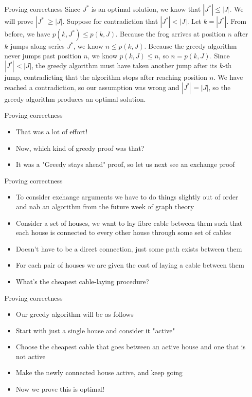 \documentclass{beamer}
\begin{document}
\begin{frame}[plain]{Proving correctness}
Since $J^*$ is an optimal solution, we know that
$| J^*| \leq | J|$. We will prove $| J^*| \geq | J|$.
Suppose for contradiction that $| J^*| < | J|$. Let
$k = | J^*|$. From before, we have $p(k, J^*) \leq p(k, J)$.
Because the frog arrives at position $n$ after $k$ jumps
along series $J^*$, we know $n \leq p(k, J)$. Because the
greedy algorithm never jumps past position $n$, we
know $p(k, J) \leq n$, so $n = p(k, J).$ Since $| J^*| < | J|$,
the greedy algorithm must have taken another
jump after its $k$-th jump, contradicting that the
algorithm stops after reaching position $n$.
We have reached a contradiction, so our
assumption was wrong and $| J^*| = | J|$, so the
greedy algorithm produces an optimal solution.
\end{frame}

\begin{frame}[plain]{Proving correctness}
    \begin{itemize}
        \item That was a lot of effort!
        \item Now, which kind of greedy proof was that?
        \item<2-> It was a "Greedy stays ahead" proof, so let us next see an exchange proof
    \end{itemize}
\end{frame}

\begin{frame}[plain]{Proving correctness}
    \begin{itemize}
        \item To consider exchange arguments we have to do things slightly out of order and nab an algorithm from the future week of graph theory
        \item Consider a set of houses, we want to lay fibre cable between them such that each house is connected to every other house through some set of cables
        \item Doesn't have to be a direct connection, just some path exists between them
        \item For each pair of houses we are given the cost of laying a cable between them
        \item What's the cheapest cable-laying procedure?
    \end{itemize}
\end{frame}

\begin{frame}[plain]{Proving correctness}
    \begin{itemize}
        \item Our greedy algorithm will be as follows
        \item Start with just a single house and consider it "active"
        \item Choose the cheapest cable that goes between an active house and one that is not active
        \item Make the newly connected house active, and keep going
        \item Now we prove this is optimal!
    \end{itemize}
\end{frame}
\end{document}
